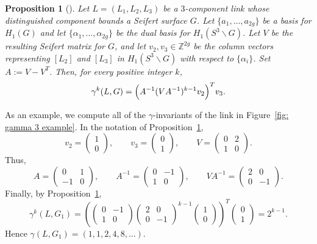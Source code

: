 \documentclass[a4paper, 11pt]{amsart}
\newtheorem{proposition}[theorem]{Proposition}
\theoremstyle{definition}
\newcommand{\Z}{\mathbb{Z}}
\begin{document}



\begin{proposition}[{\cite[Theorem~4.1]{Tsukamoto-Yasuhara:2007}}]\label{thmbody:seifert-matrix}
Let $L=(L_1,L_2,L_3)$ be a $3$-component link whose distinguished component bounds a Seifert surface $G$. Let $\{a_1,\ldots,a_{2g}\}$ be a basis for $H_1(G)$ and let
$\{\alpha_1,\ldots,\alpha_{2g}\}$ be the dual basis for $H_1(S^3\smallsetminus G)$. Let $V$ be the
resulting Seifert matrix for $G$, and let $v_2,v_3\in \Z^{2g}$ be the column vectors representing
$[L_2]$ and $[L_3]$ in $H_1(S^3\smallsetminus G)$ with respect to $\{\alpha_i\}$. Set $A:=V-V^T$.
Then, for every positive integer $k$,
\[
\gamma^k(L,G)
=
\Bigl(A^{-1}(VA^{-1})^{k-1}v_2\Bigr)^T v_3.
\]
\end{proposition}




As an example, we compute all of the $\gamma$-invariants of the link in Figure~\ref{fig: gamma 3 example}. In the notation of Proposition~\ref{thmbody:seifert-matrix},
\[
v_2=\begin{pmatrix}1\\0\end{pmatrix},\qquad
v_3=\begin{pmatrix}0\\1\end{pmatrix},\qquad
V=\begin{pmatrix}0&2\\1&0\end{pmatrix}.
\]
Thus,
\[
A=\begin{pmatrix}0&1\\-1&0\end{pmatrix},\qquad
A^{-1}=\begin{pmatrix}0&-1\\1&0\end{pmatrix},\qquad
VA^{-1}=\begin{pmatrix}2&0\\0&-1\end{pmatrix}.
\]
Finally, by Proposition~\ref{thmbody:seifert-matrix},
\[
\gamma^k(L,G_1)
=
\left(
\begin{pmatrix}0&-1\\1&0\end{pmatrix}
\begin{pmatrix}2&0\\0&-1\end{pmatrix}^{k-1}
\begin{pmatrix}1\\0\end{pmatrix}
\right)^T
\begin{pmatrix}0\\1\end{pmatrix}
=
2^{k-1}.
\]
Hence $\gamma(L,G_1)=(1,1,2,4,8,\dots)$.
\end{document}
